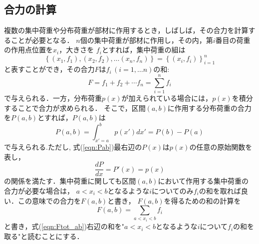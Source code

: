 \documentclass[10pt,a4j]{jbook}
\begin{document}
\subsection{合力の計算}
複数の集中荷重や分布荷重が部材に作用するとき，しばしば，その合力を計算することが必要となる．
$n$個の集中荷重が部材に作用し，その内，第$i$番目の荷重の作用点位置を$x_i$，大きさを
$f_i$とすれば，集中荷重の組は
\[
	\left\{ 
	(x_1,f_1),(x_2,f_2),\dots (x_n,f_n)
	\right\}
	=
	\left\{
		(x_i,f_i)
	\right\}_{i=1}^n
\]
と表すことができ，その合力$F$は$f_i\, (i=1,\dots n)$の和:
\begin{equation}
	F=f_1+f_2+\cdots f_n=\sum_{i=1}^n f_i
	\label{eq:Ftot}
\end{equation}
で与えられる．一方，分布荷重$p(x)$が加えられている場合には，$p(x)$を積分することで合力が求められる．
そこで，区間$(a,b)$に作用する分布荷重の合力を$P(a,b)$とすれば，$P(a,b)$は
\begin{equation}
	P(a,b)=\int_{x'=a}^{b}p(x')dx'=P(b)-P(a)
	\label{eqn:Pab}
\end{equation}
で与えられる.ただし, 式(\ref{eqn:Pab})最右辺の$P(x)$は$p(x)$の任意の原始関数を表し，
\begin{equation}
	\frac{dP}{dx}=P'(x)=p(x)
	\label{eqn:dPdx}
\end{equation}
の関係を満たす．集中荷重に関しても区間$(a,b)$において作用する集中荷重の合力が必要な場合は，
$a< x_i < b$となるような$i$についてのみ$f_i$の和を取れば良い．この意味での合力を$F(a,b)$と書き，
$F(a,b)$を得るための和の計算を
\begin{equation}
	F(a,b)=\sum_{　a < x_i <b } f_i
	\label{eq:Ftot_ab}
\end{equation}
と書き，式(\ref{eqn:Ftot_ab})右辺の和を"$a<x_i<b$となるような$i$について$f_i$の和を取る"と読むことにする．
\end{document}
